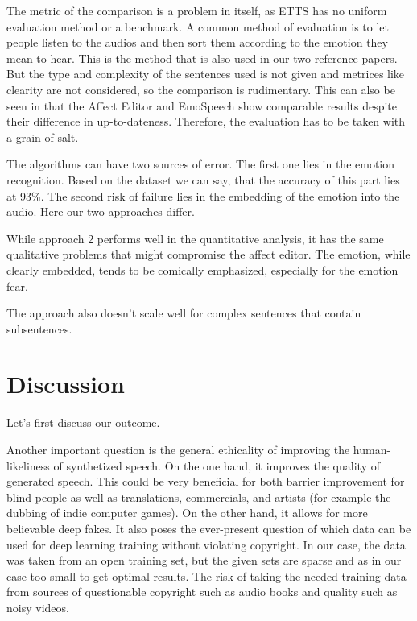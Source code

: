 \documentclass[11pt]{article}
\begin{document}
The metric of the comparison is a problem in itself, as ETTS has no uniform evaluation method or a benchmark. A common method of evaluation is to let people listen to the audios and then sort them according to the emotion they mean to hear. This is the method that is also used in our two reference papers. But the type and complexity of the sentences used is not given and metrices like clearity are not considered, so the comparison is rudimentary. This can also be seen in that the Affect Editor and EmoSpeech show comparable results despite their difference in up-to-dateness. Therefore, the evaluation has to be taken with a grain of salt.

The algorithms can have two sources of error. The first one lies in the emotion recognition. Based on the \cite{saravia-etal-2018-carer} dataset we can say, that the accuracy of this part lies at 93\%. The second risk of failure lies in the embedding of the emotion into the audio. Here our two approaches differ.


While approach 2 performs well in the quantitative analysis, it has the same qualitative problems that might compromise the affect editor. The emotion, while clearly embedded, tends to be comically emphasized, especially for the emotion fear.

The approach also doesn't scale well for complex sentences that contain subsentences.
\section{Discussion}
\label{discussion}
Let's first discuss our outcome.

Another important question is the general ethicality of improving the human-likeliness of synthetized speech. On the one hand, it improves the quality of generated speech. This could be very beneficial for both barrier improvement for blind people as well as translations, commercials, and artists (for example the dubbing of indie computer games). On the other hand, it allows for more believable deep fakes. It also poses the ever-present question of which data can be used for deep learning training without violating copyright. In our case, the data was taken from an open training set, but the given sets are sparse and as in our case too small to get optimal results\cite{he_improve_2022}. The risk of taking the needed training data from sources of questionable copyright such as audio books and quality such as noisy videos.
\end{document}
